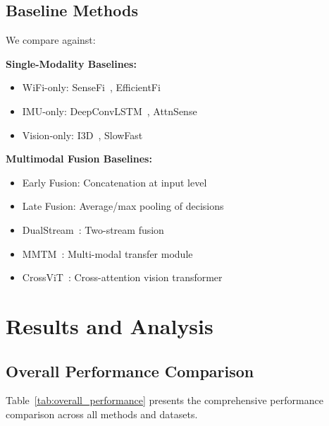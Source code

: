 \documentclass[journal]{IEEEtran}
\begin{document}
\subsection{Baseline Methods}

We compare against:

\textbf{Single-Modality Baselines:}
\begin{itemize}
\item WiFi-only: SenseFi~\cite{sensefi2023}, EfficientFi~\cite{efficientfi2022}
\item IMU-only: DeepConvLSTM~\cite{deepconvlstm2016}, AttnSense~\cite{attnsense2022}
\item Vision-only: I3D~\cite{i3d2017}, SlowFast~\cite{slowfast2019}
\end{itemize}

\textbf{Multimodal Fusion Baselines:}
\begin{itemize}
\item Early Fusion: Concatenation at input level
\item Late Fusion: Average/max pooling of decisions
\item DualStream~\cite{dualstream2023}: Two-stream fusion
\item MMTM~\cite{mmtm2023}: Multi-modal transfer module
\item CrossViT~\cite{crossvit2024}: Cross-attention vision transformer
\end{itemize}

\section{Results and Analysis}

\subsection{Overall Performance Comparison}

Table~\ref{tab:overall_performance} presents the comprehensive performance comparison across all methods and datasets.
\end{document}
